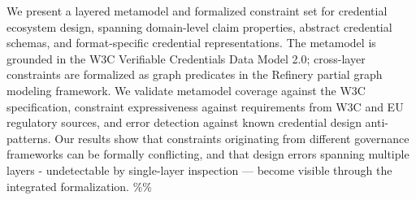 We present a layered metamodel and formalized constraint set for credential ecosystem design, spanning domain-level claim properties, abstract credential schemas, and format-specific credential representations. The metamodel is grounded in the W3C Verifiable Credentials Data Model 2.0; cross-layer constraints are formalized as graph predicates in the Refinery partial graph modeling framework. We validate metamodel coverage against the W3C specification, constraint expressiveness against requirements from W3C and EU regulatory sources, and error detection against known credential design anti-patterns. Our results show that constraints originating from different governance frameworks can be formally conflicting, and that design errors spanning multiple layers - undetectable by single-layer inspection --- become visible through the integrated formalization. \%\%
